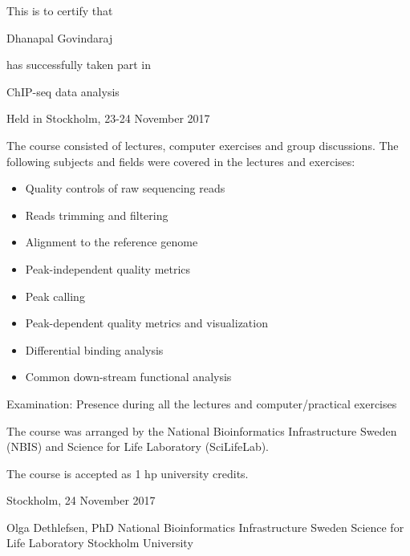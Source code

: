 \documentclass[12pt]{article}\usepackage[]{graphicx}\usepackage[]{color}
\newcommand{\courseName}{ChIP-seq data analysis}
\newcommand{\coursePoints}{1 hp}
\newcommand{\courseLocation}{Stockholm}
\newcommand{\courseDate}{23-24 November 2017}
\newcommand{\courseLastDay}{24 November 2017}
\newcommand{\courseExaminer}{Olga Dethlefsen, PhD}
\begin{document}
\large
This is to certify that 


\LARGE
Dhanapal Govindaraj

\large
has successfully taken part in \newline

\LARGE
\begin{center}{\courseName}  \end{center} 


\large
\begin{center} Held in {\courseLocation}, {\courseDate} \end{center} 

\vspace{5mm}
\normalsize
The course consisted of lectures, computer exercises and group discussions. The following subjects and fields were covered in the lectures and exercises:
\begin{itemize}
  \item Quality controls of raw sequencing reads
  \item Reads trimming and filtering
  \item Alignment to the reference genome
  \item Peak-independent quality metrics
  \item Peak calling
  \item Peak-dependent quality metrics and visualization
  \item Differential binding analysis
  \item Common down-stream functional analysis
\end{itemize}


\vspace{5mm}
Examination: Presence during all the lectures and computer/practical exercises

\vspace{5mm}
The course was arranged by the National Bioinformatics Infrastructure Sweden (NBIS) and Science for Life Laboratory (SciLifeLab).

The course is accepted as {\coursePoints} university credits.

\vspace{5mm}
{\courseLocation}, {\courseLastDay}
\vspace{20mm}


{\courseExaminer} \newline
\small
National Bioinformatics Infrastructure Sweden \newline
Science for Life Laboratory \newline
Stockholm University \newline
\end{document}
